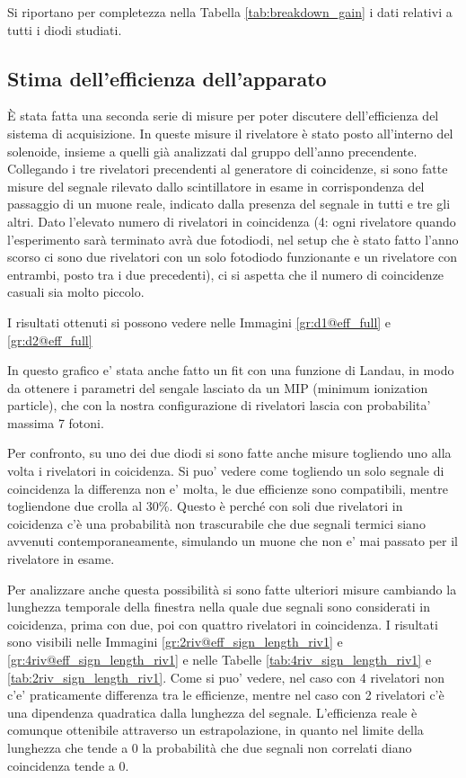 Si riportano per completezza nella Tabella \ref{tab:breakdown_gain} i dati relativi a tutti i diodi studiati.


\subsection{Stima dell'efficienza dell'apparato}
\`E stata fatta una seconda serie di misure per poter discutere dell'efficienza del sistema di acquisizione. In queste misure il rivelatore \`e stato posto all'interno del solenoide, insieme a quelli gi\`a analizzati dal gruppo dell'anno precendente. Collegando i tre rivelatori precendenti al generatore di coincidenze, si sono fatte misure del segnale rilevato dallo scintillatore in esame in corrispondenza del passaggio di un muone reale, indicato dalla presenza del segnale in tutti e tre gli altri. Dato l'elevato numero di rivelatori in coincidenza (4: ogni rivelatore quando l'esperimento sarà terminato avrà due fotodiodi, nel setup che è stato fatto l'anno scorso ci sono due rivelatori con un solo fotodiodo funzionante e un rivelatore con entrambi, posto tra i due precedenti), ci si aspetta che il numero di coincidenze casuali sia molto piccolo.

I risultati ottenuti si possono vedere nelle Immagini \ref{gr:d1@eff_full} e \ref{gr:d2@eff_full}


In questo grafico e' stata anche fatto un fit con una funzione di Landau, in modo da ottenere i parametri del sengale lasciato da un MIP (minimum ionization particle), che con la nostra configurazione di rivelatori lascia con probabilita' massima 7 fotoni.

Per confronto, su uno dei due diodi si sono fatte anche misure togliendo uno alla volta i rivelatori in coicidenza. Si puo' vedere come togliendo un solo segnale di coincidenza la differenza non e' molta, le due efficienze sono compatibili, mentre togliendone due crolla al 30\%. Questo \`e perch\'e con soli due rivelatori in coicidenza c'\`e una probabilit\`a non trascurabile che due segnali termici siano avvenuti contemporaneamente, simulando un muone che non e' mai passato per il rivelatore in esame.

Per analizzare anche questa possibilit\`a si sono fatte ulteriori misure cambiando la lunghezza temporale della finestra nella quale due segnali sono considerati in coicidenza, prima con due, poi con quattro rivelatori in coincidenza. I risultati sono visibili nelle Immagini \ref{gr:2riv@eff_sign_length_riv1} e \ref{gr:4riv@eff_sign_length_riv1} e nelle Tabelle \ref{tab:4riv_sign_length_riv1} e \ref{tab:2riv_sign_length_riv1}.
Come si puo' vedere, nel caso con 4 rivelatori non c'e' praticamente differenza tra le efficienze, mentre nel caso con 2 rivelatori c'\`e una dipendenza quadratica dalla lunghezza del segnale. L'efficienza reale \`e comunque ottenibile attraverso un estrapolazione, in quanto nel limite della lunghezza che tende a 0 la probabilit\`a che due segnali non correlati diano coincidenza tende a 0.

